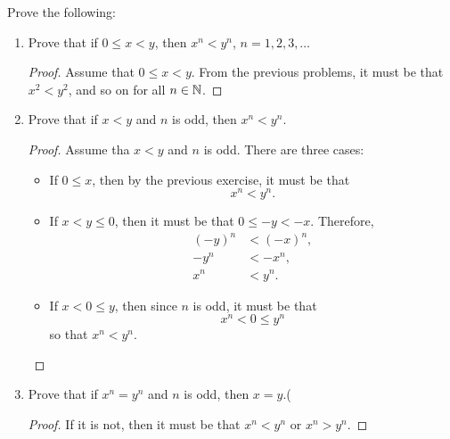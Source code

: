 \begin{exercise}[\textbf{6}] Prove the following:
     \begin{enumerate}
         \item Prove that if $0 \leq x<y$, then $x^n < y^n$, $n=1,2,3,\dotsc$
         \begin{proof} Assume that $0 \leq x < y$. From the previous problems,
         it must be that $x^2<y^2$, and so on for all $n \in \mathbb{N}$.
              
         \end{proof}
         \item Prove that if $x<y$ and $n$ is odd, then $x^n<y^n$.
         \begin{proof}Assume tha $x<y$ and $n$ is odd. There are three cases:
            \begin{itemize}
                \item If $0 \leq x$, then by the previous exercise, it must be that
                \begin{equation*}
                    x^n < y^n.
                \end{equation*} 
                \item If $x<y\leq 0$, then it must be that $0 \leq -y < -x$. Therefore, 
                \begin{align*}
                    (-y)^n &< (-x)^n, \\
                    -y^n &< -x^n, \\
                    x^n &< y^n.
                \end{align*}
                \item If $x<0 \leq y$, then since $n$ is odd, it must be that 
                \begin{equation*}
                    x^n < 0 \leq y^n
                \end{equation*}
                so that $x^n < y^n$.
            \end{itemize}
              
         \end{proof}
         \item Prove that if $x^n = y^n$ and $n$ is odd, then $x=y$.(
         \begin{proof} 
            If it is not, then it must be that $x^n < y^n$ or $x^n > y^n$.
              

\end{proof}
\end{enumerate}
\end{exercise}
